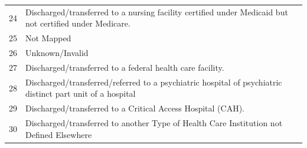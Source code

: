 \begin{table}[H]
\begin{tabularx}{\textwidth}{rX}
    24 & Discharged/transferred to a nursing facility certified under Medicaid but not certified under Medicare. \\
    25 & Not Mapped \\
    26 & Unknown/Invalid \\
    27 & Discharged/transferred to a federal health care facility. \\
    28 & Discharged/transferred/referred to a psychiatric hospital of psychiatric distinct part unit of a hospital \\
    29 & Discharged/transferred to a Critical Access Hospital (CAH). \\
    30 & Discharged/transferred to another Type of Health Care Institution not Defined Elsewhere \\
    \bottomrule
    \end{tabularx}
    \label{tab:discharge-disposition}
\end{table}

